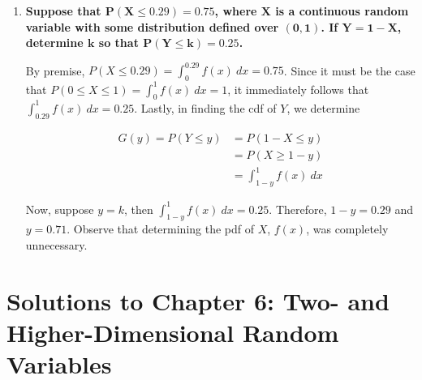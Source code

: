 \documentclass[10pt, oneside]{article}
\begin{document}
\begin{enumerate}[label=5.\arabic*]
Which is clearly positive for $X \in (50d, 200d)$, and it also follows that $\int^{200d}_{50d} \frac{1}{10d} \Big( \frac{2X}{d} \Big)^{-1/2} \ dx = \boxed{1}$.

\item  \begin{tcolorbox}[
  colback=Cerulean!5!white,
  colframe=Cerulean!75!black]
\textbf{Suppose that $\bm{P(X \leq 0.29) = 0.75}$, where $\bm{X}$ is a continuous random variable with some distribution defined over $\bm{(0,1)}$. If $\bm{Y = 1 - X}$, determine $\bm{k}$ so that $\bm{P(Y \leq k) = 0.25}$.}
\end{tcolorbox}

By premise, $P(X \leq 0.29) = \int^{0.29}_0 f(x) \ dx = 0.75$. Since it must be the case that $P(0 \leq X \leq 1) = \int^1_0 f(x) \ dx = 1$, it immediately follows that $\int^1_{0.29} f(x) \ dx = 0.25$. Lastly, in finding the cdf of $Y$, we determine

\begin{align*}
G(y) = P(Y \leq y) &= P(1 - X \leq y) \\
&= P(X \geq 1 - y) \\
&= \int^1_{1-y} f(x) \ dx
\end{align*}

Now, suppose $y = k$, then $\int^1_{1-y} f(x) \ dx = 0.25$. Therefore, $1 - y = 0.29$ and $\boxed{y = 0.71}$. Observe that determining the pdf of $X$, $f(x)$, was completely unnecessary.

\end{enumerate}

\newpage


\setcounter{cor}{0}
\setcounter{prop}{0}
\setcounter{cor*}{0}

{}
\section*{Solutions to Chapter 6: Two- and Higher-Dimensional Random Variables}
\end{document}

